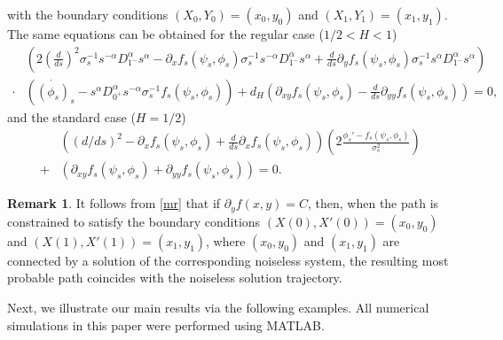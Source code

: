 \documentclass{article}
\theoremstyle{definition}  %
\newtheorem{remark}{Remark}
\theoremstyle{plain}  %
\begin{document}
with the boundary conditions $ (X_0,Y_0) = (x_0,y_0 )$ and $(X_1, Y_1) = (x_1,y_1 )$.
The same equations can be obtained for the regular  case ($1/2<H<1$)
\begin{align*}
   &\left( 2 \left( \frac{d}{ds} \right)^2 \sigma_s^{-1} s^{-\alpha} D_{1^-}^\alpha s^{\alpha} - \partial_x f_s(\psi_s, \phi_s) \sigma_s^{-1} s^{-\alpha} D_{1^-}^\alpha s^{\alpha} + \frac{d}{ds} \partial_y f_s(\psi_s, \phi_s) \sigma_s^{-1} s^{\alpha} D_{1^-}^\alpha s^{\alpha}\right)\\
   \cdot &\left( \dot{(\phi_s)}_s - s^{\alpha} D_{0^+}^\alpha s^{-\alpha} \sigma_s^{-1} f_s(\psi_s, \phi_s) \right) + d_H \left( \partial_{xy} f_s(\psi_s, \phi_s) - \frac{d}{ds} \partial_{yy} f_s(\psi_s, \phi_s) \right) = 0,
\end{align*}
and  the standard case ($H=1/2$)
\begin{align*}
    &((d/ds)^2-\partial_x f_s(\psi_s,\phi_s)+\frac{d}{ds}\partial_x f_s(\psi_s,\phi_s))(2\frac{\phi_s'-f_s(\psi_s,\phi_s)}{\sigma_s^2})\\ +&
    (\partial_{xy}f_s(\psi_s,\phi_s)+\partial_{yy}f_s(\psi_s,\phi_s))=0.
\end{align*}

    \begin{remark}\label{remark}
      It follows from \eqref{mr} that if $\partial_y f(x,y)=C$, then, when the path is constrained to satisfy the boundary conditions $(X(0),X'(0))=(x_0,y_0)$ and $(X(1),X'(1))=(x_1,y_1)$, where $(x_0,y_0)$ and $(x_1,y_1)$ are connected by a solution of the corresponding noiseless system, the resulting most probable path coincides with the noiseless solution trajectory.

    \end{remark}
    
   Next, we illustrate our main results via the following examples. All numerical simulations in this paper were performed using MATLAB. 
\end{document}
